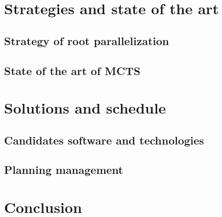 \documentclass[12pt]{article}
\begin{document}
\newpage
\section{Strategies and state of the art}
\subsection{Strategy of root parallelization}
\subsection{State of the art of MCTS}

\newpage
\section{Solutions and schedule}
\subsection{Candidates software and technologies}
\subsection {Planning management} 
\newpage
\section*{Conclusion}

\newpage


\end{document}
